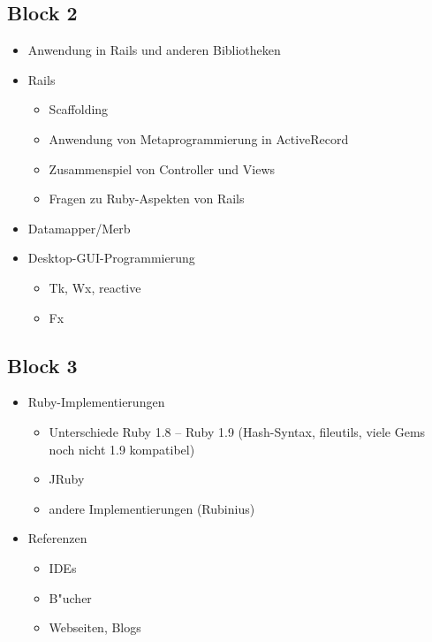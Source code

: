\documentclass[a4paper,10pt]{article}
\begin{document}
\subsection*{Block 2}
\begin{itemize}
  \item Anwendung in Rails und anderen Bibliotheken
  \item Rails
  \begin{itemize}
    \item Scaffolding
    \item Anwendung von Metaprogrammierung in ActiveRecord
    \item Zusammenspiel von Controller und Views
    \item Fragen zu Ruby-Aspekten von Rails
  \end{itemize}
  \item Datamapper/Merb
  \item Desktop-GUI-Programmierung
  \begin{itemize}
    \item Tk, Wx, reactive
    \item Fx
  \end{itemize}
\end{itemize} 

\subsection*{Block 3}
\begin{itemize}
  \item Ruby-Implementierungen
  \begin{itemize}
    \item Unterschiede Ruby 1.8 -- Ruby 1.9 (Hash-Syntax, fileutils, viele Gems noch nicht 1.9 kompatibel)
    \item JRuby
    \item andere Implementierungen (Rubinius)
  \end{itemize}
  \item Referenzen
  \begin{itemize}
    \item IDEs
    \item B"ucher
    \item Webseiten, Blogs
  \end{itemize}
\end{itemize}
\end{document}
